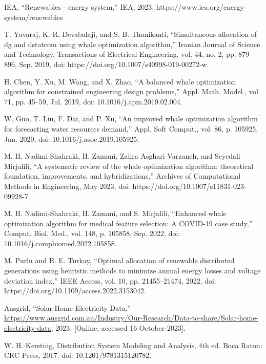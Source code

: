 \documentclass[conference]{IEEEtran}
\begin{document}
\begin{thebibliography}{00}

 IEA, “Renewables - energy system,” IEA, 2023. https://www.iea.org/energy-system/renewables

 T. Yuvaraj, K. R. Devabalaji, and S. B. Thanikanti, “Simultaneous allocation of dg and dstatcom using whale optimization algorithm,” Iranian Journal of Science and Technology, Transactions of Electrical Engineering, vol. 44, no. 2, pp. 879–896, Sep. 2019, doi: https://doi.org/10.1007/s40998-019-00272-w.

 H. Chen, Y. Xu, M. Wang, and X. Zhao, “A balanced whale optimization algorithm for constrained engineering design problems,” Appl. Math. Model., vol. 71, pp. 45–59, Jul. 2019, doi: 10.1016/j.apm.2019.02.004.

 	W. Guo, T. Liu, F. Dai, and P. Xu, “An improved whale optimization algorithm for forecasting water resources demand,” Appl. Soft Comput., vol. 86, p. 105925, Jan. 2020, doi: 10.1016/j.asoc.2019.105925.

 M. H. Nadimi-Shahraki, H. Zamani, Zahra Asghari Varzaneh, and Seyedali Mirjalili, “A systematic review of the whale optimization algorithm: theoretical foundation, improvements, and hybridizations,” Archives of Computational Methods in Engineering, May 2023, doi: https://doi.org/10.1007/s11831-023-09928-7.

 M. H. Nadimi-Shahraki, H. Zamani, and S. Mirjalili, “Enhanced whale optimization algorithm for medical feature selection: A COVID-19 case study,” Comput. Biol. Med., vol. 148, p. 105858, Sep. 2022, doi: 10.1016/j.compbiomed.2022.105858.

 M. Purlu and B. E. Turkay, “Optimal allocation of renewable distributed generations using heuristic methods to minimize annual energy losses and voltage deviation index,” IEEE Access, vol. 10, pp. 21455–21474, 2022, doi: https://doi.org/10.1109/access.2022.3153042.



Ausgrid, ``Solar Home Electricity Data,''
\url{https://www.ausgrid.com.au/Industry/Our-Research/Data-to-share/Solar-home-electricity-data}, 2023. [Online; accessed 16-October-2023].

 W. H. Kersting, Distribution System Modeling and Analysis, 4th ed. Boca Raton: CRC Press, 2017. doi: 10.1201/9781315120782.


\end{thebibliography}
\end{document}
